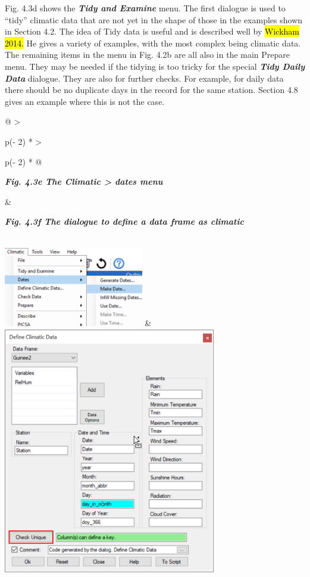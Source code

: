 \documentclass[
  letterpaper,
  DIV=11,
  numbers=noendperiod]{scrreprt}
\begin{document}
Fig. 4.3d shows the \textbf{\emph{Tidy and Examine}} menu. The first
dialogue is used to ``tidy'' climatic data that are not yet in the shape
of those in the examples shown in Section 4.2. The idea of Tidy data is
useful and is described well by \hl{Wickham 2014.} He gives a variety of
examples, with the most complex being climatic data. The remaining items
in the menu in Fig. 4.2b are all also in the main Prepare menu. They may
be needed if the tidying is too tricky for the special
\textbf{\emph{Tidy Daily Data}} dialogue. They are also for further
checks. For example, for daily data there should be no duplicate days in
the record for the same station. Section 4.8 gives an example where this
is not the case.

\begin{longtable}[]{@{}
  >{\raggedright\arraybackslash}p{(\columnwidth - 2\tabcolsep) * }
  >{\raggedright\arraybackslash}p{(\columnwidth - 2\tabcolsep) * }@{}}
\toprule\noalign{}
\begin{minipage}[b]{\linewidth}\raggedright
\textbf{\emph{Fig. 4.3e The Climatic \textgreater{} dates menu}}
\end{minipage} & \begin{minipage}[b]{\linewidth}\raggedright
\textbf{\emph{Fig. 4.3f The dialogue to define a data frame as
climatic}}
\end{minipage} \\
\midrule\noalign{}
\endhead
\bottomrule\noalign{}
\endlastfoot
\includegraphics[width=2.40168in,height=1.3685in]{figures/Fig4.3e.png} &
\includegraphics[width=3.6608in,height=4.27093in]{figures/Fig4.3f.png} \\
\end{longtable}
\end{document}
